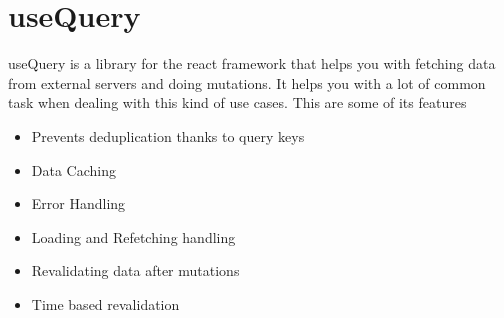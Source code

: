 \section{useQuery}
\label{sec:ch3sec11}
useQuery is a library for the react framework that helps you with fetching data from external servers and doing mutations. It helps you with a lot of common task when dealing with this kind of use cases. This are some of its features
\begin{itemize}
	\item Prevents deduplication thanks to query keys
	\item Data Caching
	\item Error Handling
	\item Loading and Refetching handling
	\item Revalidating data after mutations
	\item Time based revalidation
\end{itemize}
